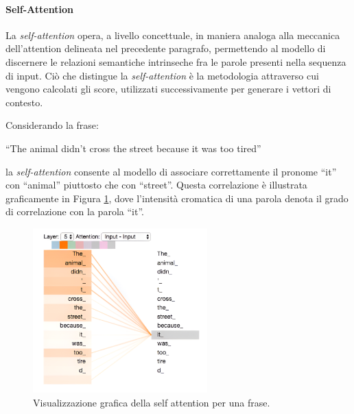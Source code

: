 \documentclass[12pt,a4paper,twoside,openright]{book}
\begin{document}
\paragraph{Self-Attention}

La \emph{self-attention} opera, a livello concettuale, in maniera analoga alla meccanica dell'attention delineata nel precedente paragrafo, permettendo al modello di discernere le relazioni semantiche intrinseche fra le parole presenti nella sequenza di input. Ciò che distingue la \emph{self-attention} è la metodologia attraverso cui vengono calcolati gli score, utilizzati successivamente per generare i vettori di contesto.

Considerando la frase:
\begin{center}
    ``The animal didn't cross the street because it was too tired''
\end{center}
la \emph{self-attention} consente al modello di associare correttamente il pronome ``it'' con ``animal'' piuttosto che con ``street''. Questa correlazione è illustrata graficamente in Figura \ref{fig:attention-rel}, dove l'intensità cromatica di una parola denota il grado di correlazione con la parola ``it''.

\begin{figure}
    \centering
    \includegraphics[width=0.6\textwidth]{images/transformer_self-attention_visualization.png}
    \caption{Visualizzazione grafica della self attention per una frase.}
    \label{fig:attention-rel}
\end{figure}
\end{document}

